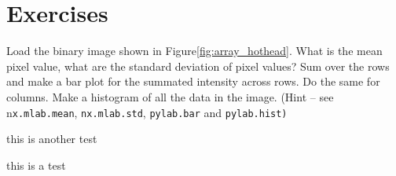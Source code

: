 \section{Exercises}

\begin{xca}
Load the binary image shown in Figure\ref{fig:array_hothead}. What
is the mean pixel value, what are the standard deviation of pixel
values? Sum over the rows and make a bar plot for the summated intensity
across rows. Do the same for columns. Make a histogram of all the
data in the image. (Hint -- see n\texttt{x.mlab.mean}, \texttt{nx.mlab.std},
\texttt{pylab.bar} and \texttt{pylab.hist)}
\end{xca}
\begin{example}
this is another test
\end{example}
this is a test
